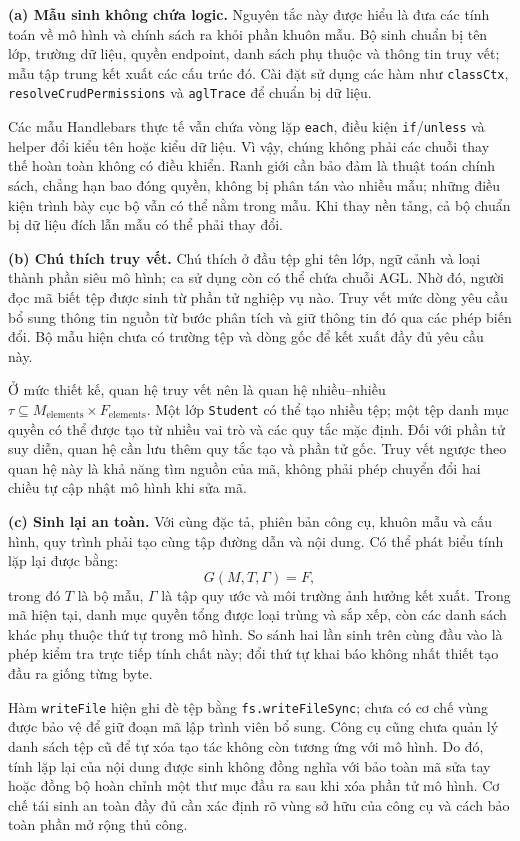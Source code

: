 \textbf{(a) Mẫu sinh không chứa logic.} Nguyên tắc này được hiểu là đưa các tính toán về mô hình và chính sách ra khỏi phần khuôn mẫu. Bộ sinh chuẩn bị tên lớp, trường dữ liệu, quyền endpoint, danh sách phụ thuộc và thông tin truy vết; mẫu tập trung kết xuất các cấu trúc đó. Cài đặt sử dụng các hàm như \texttt{classCtx}, \texttt{resolveCrudPermissions} và \texttt{aglTrace} để chuẩn bị dữ liệu.

Các mẫu Handlebars thực tế vẫn chứa vòng lặp \texttt{each}, điều kiện \texttt{if}/\texttt{unless} và helper đổi kiểu tên hoặc kiểu dữ liệu. Vì vậy, chúng không phải các chuỗi thay thế hoàn toàn không có điều khiển. Ranh giới cần bảo đảm là thuật toán chính sách, chẳng hạn bao đóng quyền, không bị phân tán vào nhiều mẫu; những điều kiện trình bày cục bộ vẫn có thể nằm trong mẫu. Khi thay nền tảng, cả bộ chuẩn bị dữ liệu đích lẫn mẫu có thể phải thay đổi.

\textbf{(b) Chú thích truy vết.} Chú thích ở đầu tệp ghi tên lớp, ngữ cảnh và loại thành phần siêu mô hình; ca sử dụng còn có thể chứa chuỗi AGL. Nhờ đó, người đọc mã biết tệp được sinh từ phần tử nghiệp vụ nào. Truy vết mức dòng yêu cầu bổ sung thông tin nguồn từ bước phân tích và giữ thông tin đó qua các phép biến đổi. Bộ mẫu hiện chưa có trường tệp và dòng gốc để kết xuất đầy đủ yêu cầu này.

Ở mức thiết kế, quan hệ truy vết nên là quan hệ nhiều--nhiều $\tau\subseteq M_{\mathrm{elements}}\times F_{\mathrm{elements}}$. Một lớp \texttt{Student} có thể tạo nhiều tệp; một tệp danh mục quyền có thể được tạo từ nhiều vai trò và các quy tắc mặc định. Đối với phần tử suy diễn, quan hệ cần lưu thêm quy tắc tạo và phần tử gốc. Truy vết ngược theo quan hệ này là khả năng tìm nguồn của mã, không phải phép chuyển đổi hai chiều tự cập nhật mô hình khi sửa mã.

\textbf{(c) Sinh lại an toàn.} Với cùng đặc tả, phiên bản công cụ, khuôn mẫu và cấu hình, quy trình phải tạo cùng tập đường dẫn và nội dung. Có thể phát biểu tính lặp lại được bằng:
\[
G(M,T,\Gamma)=F,
\]
trong đó $T$ là bộ mẫu, $\Gamma$ là tập quy ước và môi trường ảnh hưởng kết xuất. Trong mã hiện tại, danh mục quyền tổng được loại trùng và sắp xếp, còn các danh sách khác phụ thuộc thứ tự trong mô hình. So sánh hai lần sinh trên cùng đầu vào là phép kiểm tra trực tiếp tính chất này; đổi thứ tự khai báo không nhất thiết tạo đầu ra giống từng byte.

Hàm \texttt{writeFile} hiện ghi đè tệp bằng \texttt{fs.writeFileSync}; chưa có cơ chế vùng được bảo vệ để giữ đoạn mã lập trình viên bổ sung. Công cụ cũng chưa quản lý danh sách tệp cũ để tự xóa tạo tác không còn tương ứng với mô hình. Do đó, tính lặp lại của nội dung được sinh không đồng nghĩa với bảo toàn mã sửa tay hoặc đồng bộ hoàn chỉnh một thư mục đầu ra sau khi xóa phần tử mô hình. Cơ chế tái sinh an toàn đầy đủ cần xác định rõ vùng sở hữu của công cụ và cách bảo toàn phần mở rộng thủ công.

